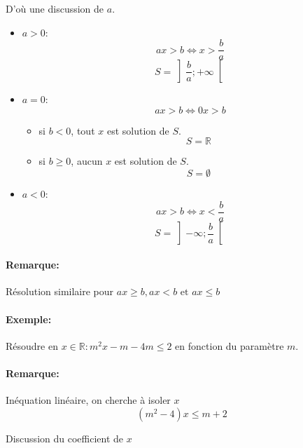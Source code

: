 \documentclass[
    11pt,
    a4paper,
    oneside,
    headinlcude, footinclude,
    twoside,
]{report}
\begin{document}
D'où une discussion de $a$.

\begin{itemize}
    \item $a > 0$:
        $$ax > b \iff x > \frac{b}{a}$$ $$S = \left] \frac{b}{a};
        + \infty \right[$$
    \item $a = 0$:
        $$ax > b \iff 0x > b$$
        \begin{itemize}
            \item si $b < 0$, tout $x$ est solution de $S$.
                $$S = \mathbb{R}$$
            \item si $b \geq 0$, aucun $x$ est solution de $S$.
                $$S = \emptyset$$
        \end{itemize}
    \item $a < 0$:
        $$ax > b \iff x < \frac{b}{a}$$ $$S = \left] - \infty;
         \frac{b}{a} \right[$$
\end{itemize}

\paragraph{Remarque:}

Résolution similaire pour $ax \geq b, ax < b \text{ et } ax \leq b$

\paragraph{Exemple:}

Résoudre en $x \in \mathbb{R}: m^{2}x - m - 4m \leq 2$ en fonction du
paramètre $m$.

\paragraph{Remarque:}

Inéquation linéaire, on cherche à isoler $x$ $$(m^{2} - 4)x \leq m + 2$$

Discussion du coefficient de $x$ 
\end{document}
